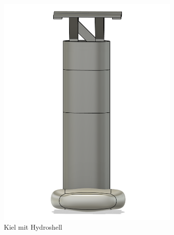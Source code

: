 \begin{figure}[H]
    \centering
    \begin{subfigure}[b]{0.51\linewidth}
        \centering
        \includegraphics[width=\linewidth]{assets/kiel_1.png}
        \caption{Kiel mit Hydroshell}
        \label{fig:kiel1}
    \end{subfigure}
    \hfill
    \begin{subfigure}[b]{0.39\linewidth}
        \centering

\end{subfigure}
\end{figure}
